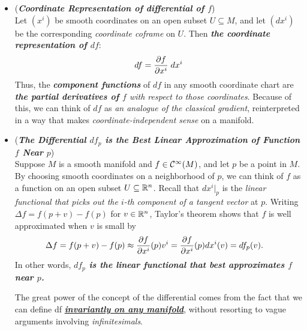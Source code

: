 \documentclass[11pt]{article}
\begin{document}
\begin{itemize}
\item \begin{remark} (\emph{\textbf{Coordinate Representation of differential of $f$}})\\
Let $(x^i)$ be smooth coordinates on an open subset $U \subseteq M$, and let $(dx^i)$ be the corresponding \emph{coordinate coframe} on $U$. Then \emph{\textbf{the coordinate representation of $df$}}:
\begin{align}
df = \frac{\partial f}{ \partial x^{i}} \; dx^i  \label{eqn: differential_covector_coordinate_representation}
\end{align} Thus, the \emph{\textbf{component functions}} of $df$ in any smooth coordinate chart are \emph{\textbf{the partial derivatives of $f$} with respect to those coordinates}. Because of this, we can think of $df$ as \emph{an analogue of the classical gradient}, reinterpreted in a way that makes \emph{coordinate-independent sense} on a manifold.
\end{remark}

\item \begin{remark} (\emph{\textbf{The Differential $df_p$ is the Best Linear Approximation of Function $f$ Near $p$}})\\
 Suppose $M$ is a smooth manifold and $f \in {\mathcal C}^{\infty}(M)$, and let $p$ be a point in $M$. By choosing smooth coordinates on a neighborhood of $p$, we can think of $f$ as a function on an open subset $U\subseteq {\mathbb R}^n$.  Recall that $dx^i |_p$ is the \emph{linear functional that picks out the $i$-th component of a tangent vector} at $p$.  Writing $\Delta f = f(p + v) - f(p)$ for $v\in {\mathbb R}^{n}$, Taylor’s theorem shows that $f$ is well approximated when $v$ is small by
\begin{align*}
\Delta f = f(p + v) -  f(p)  &\approx \frac{\partial f}{ \partial x^{i}}(p) v^{i} = \frac{\partial f}{ \partial x^{i}}(p) dx^{i}(v) = df_{p} (v).
\end{align*} In other words, \emph{\textbf{$df_p$ is the linear functional that best approximates $f$ near $p$.}}

The great power of the concept of the differential comes from the fact that we can define df \underline{\emph{\textbf{invariantly on any manifold}}}, without resorting
to vague arguments involving \emph{infinitesimals}.
\end{remark}
\end{itemize}
\end{document}

